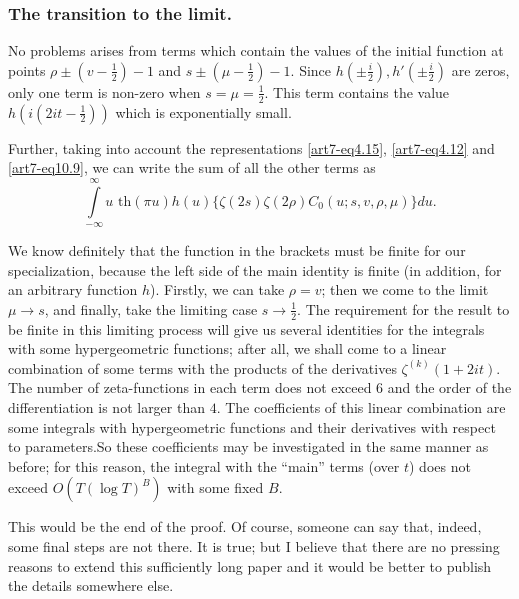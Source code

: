 \setcounter{section}{2}
\subsubsection{The transition to the limit.}\label{art7-subsubsec2.9.2}
No problems arises from terms which contain the values of the initial function at points $\rho \pm (v - \frac{1}{2}) -1$ and $s\pm (\mu -\frac{1}{2}) -1$. Since $h (\pm \frac{i}{2}), h'(\pm \frac{i}{2})$ are zeros, only one term is non-zero when $s =\mu = \frac{1}{2}$. This term contains the value $h(i(2 it -\frac{1}{2}))$ which is exponentially small.

Further, taking into account the representations \eqref{art7-eq4.15}, \eqref{art7-eq4.12} and \eqref{art7-eq10.9}, we can write the sum of all the other terms as 
\setcounter{section}{10}
\begin{equation}
\int\limits^\infty_{-\infty} u \text{ th} (\pi u) h(u) \{\zeta (2s) \zeta(2 \rho) C_0 (u; s, v, \rho, \mu) \} du. \label{art7-eq10.13}
\end{equation}

We know definitely that the function in the brackets must be finite for our specialization, because the left side of the main identity is finite (in addition, for an arbitrary function $h$). Firstly, we can take $\rho = v$; then we come to the limit $\mu \to s$, and finally, take the limiting case $s \to \frac{1}{2}$. The requirement for the result to be finite in this limiting process will give us several identities for the integrals with some hypergeometric functions; after all, we shall come to a linear combination of some terms with the products of the derivatives $\zeta^{(k)} (1+ 2 it)$. The number of zeta-functions in each term does not exceed 6 and the order of the differentiation is not larger than $4$. The coefficients of this linear combination are some integrals with hypergeometric functions and their derivatives with respect to parameters.\pageoriginale So these coefficients may be investigated in the same manner as before; for this reason, the integral with the ``main'' terms (over $t$) does not exceed $O(T (\log T)^B)$ with some fixed $B$.

This would be the end of the proof. Of course, someone can say that, indeed, some final steps are not there. It is true; but I believe that there are no pressing reasons to extend this sufficiently long paper and it would be better to publish the details somewhere else. 

